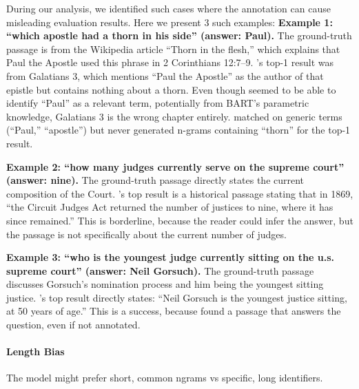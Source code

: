 During our analysis, we identified such cases where the annotation can cause misleading evaluation results. Here we present 3 such examples:
\textbf{Example 1: ``which apostle had a thorn in his side'' (answer: Paul).} The ground-truth passage %
is from the Wikipedia article ``Thorn in the flesh,'' which explains that Paul the Apostle used this phrase in 2 Corinthians 12:7--9. 's  top-1 result %
was from Galatians 3, which mentions ``Paul the Apostle'' as the author of that epistle but contains nothing about a thorn. Even though  seemed to be able to identify ``Paul'' as a relevant term, potentially from BART's parametric knowledge, Galatians 3 is the wrong chapter entirely.  matched on generic terms (``Paul,'' ``apostle'') but never generated n-grams containing ``thorn'' for the top-1 result.

\textbf{Example 2: ``how many judges currently serve on the supreme court'' (answer: nine).} The ground-truth passage %
directly states the current composition of the Court. 's top result is a historical passage stating that in 1869, ``the Circuit Judges Act returned the number of justices to nine, where it has since remained.'' This is borderline, because the reader could infer the answer, but the passage is not specifically about the current number of judges.

\textbf{Example 3: ``who is the youngest judge currently sitting on the u.s. supreme court'' (answer: Neil Gorsuch).} The ground-truth passage discusses Gorsuch's nomination process and him being the youngest sitting justice. 's top result
directly states: ``Neil Gorsuch is the youngest justice sitting, at 50 years of age.'' This is a success, because  found a passage that answers the question, even if not annotated.



\paragraph{Length Bias}
\label{sec:length-bias}
The model might prefer short, common ngrams vs specific, long identifiers.




